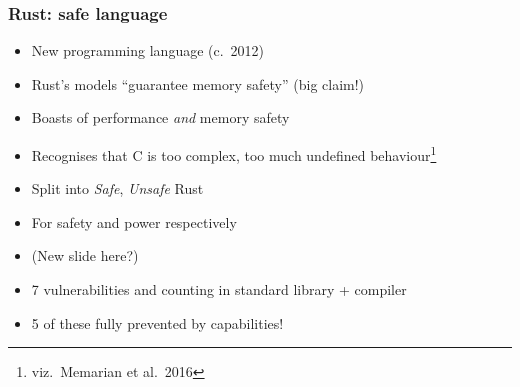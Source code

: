 \documentclass{beamer}
\begin{document}
\begin{frame}
\frametitle{Rust: safe language}

\begin{itemize}
    \item New programming language (c.\ 2012)
    \item Rust's models ``guarantee memory safety'' (big claim!)
    \item Boasts of performance \emph{and} memory safety
    \item Recognises that C is too complex, too much undefined behaviour\footnote{viz.\ Memarian et al.\ 2016}
    \item Split into \emph{Safe}, \emph{Unsafe} Rust
    \item For safety and power respectively
    \item (New slide here?)
    \item 7 vulnerabilities and counting in standard library + compiler
    \item 5 of these fully prevented by capabilities!
\end{itemize}
\end{frame}
\end{document}

